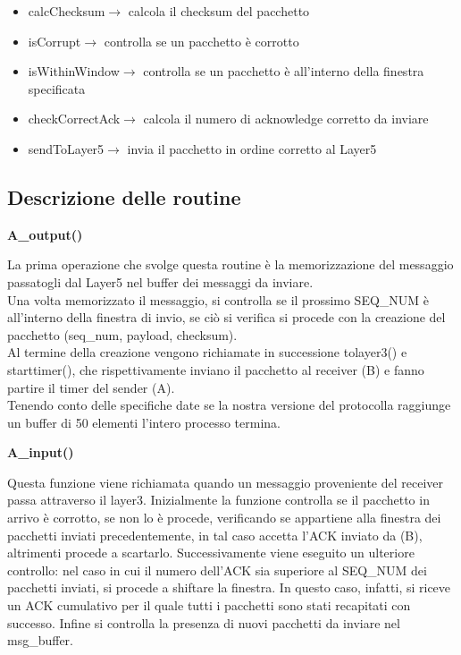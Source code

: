 \documentclass[a4paperr]{article}
\begin{document}
\begin{itemize}
\item calcChecksum$\rightarrow$ calcola il checksum del pacchetto
\item isCorrupt$\rightarrow$ controlla se un pacchetto è corrotto
\item isWithinWindow$\rightarrow$ controlla se un pacchetto è all'interno della finestra specificata
\item checkCorrectAck$\rightarrow$  calcola il numero di acknowledge corretto da inviare
\item sendToLayer5$\rightarrow$ invia il pacchetto in ordine corretto al Layer5
\end{itemize}

\newpage

\subsection{Descrizione delle routine}
\begin{flushleft}
\textbf{A\_output()}
\end{flushleft}
La prima operazione che svolge questa routine è la memorizzazione del messaggio passatogli dal Layer5 nel buffer dei messaggi da inviare. \\ Una volta memorizzato il messaggio, si controlla se il prossimo SEQ\_NUM è all'interno della finestra di invio, se ciò si verifica si procede con la creazione del pacchetto (seq\_num, payload, checksum). \\ Al termine della creazione vengono richiamate in successione tolayer3() e starttimer(), che rispettivamente inviano il pacchetto al receiver (B) e fanno partire il timer del sender (A). \\ Tenendo conto delle specifiche date se la nostra versione del protocolla raggiunge un buffer di 50 elementi l'intero processo termina.

\begin{flushleft}
\textbf{A\_input()}
\end{flushleft}
Questa funzione viene richiamata quando un messaggio proveniente del receiver passa attraverso il layer3. Inizialmente la funzione controlla se il pacchetto in arrivo è corrotto, se non lo è procede, verificando se appartiene alla finestra dei pacchetti inviati precedentemente, in tal caso accetta l’ACK inviato da (B), altrimenti procede a scartarlo. Successivamente viene eseguito un ulteriore controllo: nel caso in cui il numero dell'ACK sia superiore al SEQ\_NUM dei pacchetti inviati, si procede a shiftare la finestra. In questo caso, infatti, si riceve un ACK cumulativo per il quale tutti i pacchetti sono stati recapitati con successo. Infine si controlla la presenza di nuovi pacchetti da inviare nel msg\_buffer.
\end{document}
